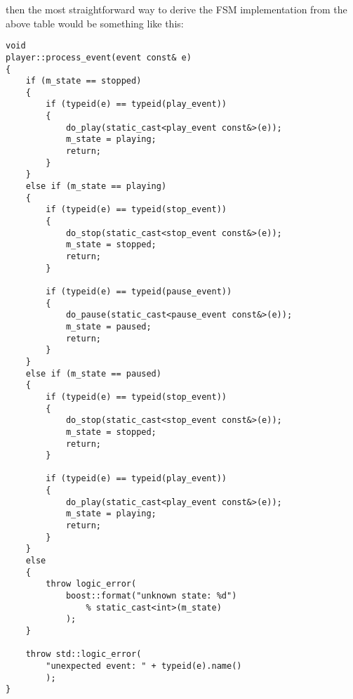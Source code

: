\documentclass{kapproc}
\begin{document}

then the most straightforward way to derive the FSM 
implementation from the above table would be something 
like this:

{\small
\begin{codesamp}\begin{verbatim}
void
player::process_event(event const& e)
{
    if (m_state == stopped)
    {
        if (typeid(e) == typeid(play_event))
        {
            do_play(static_cast<play_event const&>(e));
            m_state = playing;
            return;
        }
    }
    else if (m_state == playing)
    {
        if (typeid(e) == typeid(stop_event))
        {
            do_stop(static_cast<stop_event const&>(e));
            m_state = stopped;
            return;
        }

        if (typeid(e) == typeid(pause_event))
        {
            do_pause(static_cast<pause_event const&>(e));
            m_state = paused;
            return;
        }
    }
    else if (m_state == paused)
    {
        if (typeid(e) == typeid(stop_event))
        {
            do_stop(static_cast<stop_event const&>(e));
            m_state = stopped;
            return;
        }

        if (typeid(e) == typeid(play_event))
        {
            do_play(static_cast<play_event const&>(e));
            m_state = playing;
            return;
        }
    }
    else
    {
        throw logic_error(
            boost::format("unknown state: %d")
                % static_cast<int>(m_state)
            );
    }

    throw std::logic_error(
        "unexpected event: " + typeid(e).name()
        );
}
\end{verbatim}
\end{codesamp}
}
\end{document}
